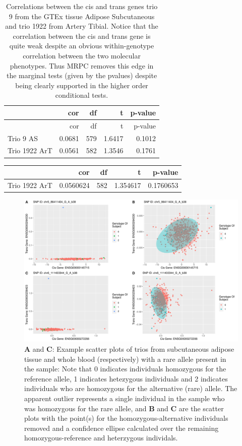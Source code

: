 \documentclass[
]{article}
\begin{document}
\begin{longtable}[]{@{}lrrrr@{}}
\caption{Correlations between the cis and trans genes trio 9 from the
GTEx tissue Adipose Subcutaneous and trio 1922 from Artery Tibial.
Notice that the correlation between the cis and trans gene is quite weak
despite an obvious within-genotype correlation between the two molecular
phenotypes. Thus MRPC removes this edge in the marginal tests (given by
the pvalues) despite being clearly supported in the higher order
conditional tests.}\tabularnewline
\toprule
& cor & df & t & p-value \\
\midrule
\endfirsthead
\toprule
& cor & df & t & p-value \\
\midrule
\endhead
Trio 9 AS & 0.0681 & 579 & 1.6417 & 0.1012 \\
Trio 1922 ArT & 0.0561 & 582 & 1.3546 & 0.1761 \\
\bottomrule
\end{longtable}

\begin{longtable}[]{@{}lrrrr@{}}
\toprule
& cor & df & t & p-value \\
\midrule
\endhead
Trio 1922 ArT & 0.0560624 & 582 & 1.354617 & 0.1760653 \\
\bottomrule
\end{longtable}

\begin{figure}
\centering
\includegraphics{12_15_2021_GMAC_plots_all_trios_files/figure-latex/unnamed-chunk-10-1.pdf}
\caption{\textbf{A} and \textbf{C}: Example scatter plots of trios from
subcutaneous adipose tissue and whole blood (respectively) with a rare
allele present in the sample: Note that 0 indicates individuals
homozygous for the reference allele, 1 indicates hetezygous individuals
and 2 indicates individuals who are homozygous for the alternative
(rare) allele. The apparent outlier represents a single individual in
the sample who was homozygous for the rare allele, and \textbf{B} and
\textbf{C} are the scatter plots with the point(s) for the
homozygous-alternative individuals removed and a confidence ellipse
calculated over the remaining homozygous-reference and heterzygous
individals.}
\end{figure}
\end{document}
